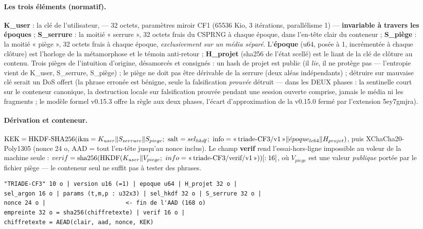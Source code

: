 \paragraph{Les trois éléments (normatif).} \textbf{K\_user} : la clé de l'utilisateur,
 — 32 octets, paramètres miroir CF1 (65536 Kio,
3 itérations, parallélisme 1) — \textbf{invariable à travers les époques} ;
\textbf{S\_serrure} : la moitié « serrure », 32 octets frais du CSPRNG à chaque époque,
dans l'en-tête clair du conteneur ; \textbf{S\_piège} : la moitié « piège », 32 octets
frais à chaque époque, \emph{exclusivement sur un média séparé}. L'\textbf{époque}
(u64, posée à 1, incrémentée à chaque clôture) est l'horloge de la métamorphose et le
témoin anti-retour ; \textbf{H\_projet} (sha256 de l'état scellé) est le liant de la clé
de clôture au contenu. Trois pièges de l'intuition d'origine, désamorcés et consignés :
un hash de projet est public (il \emph{lie}, il ne protège pas — l'entropie vient de
K\_user, S\_serrure, S\_piège) ; le piège ne doit pas être dérivable de la serrure
(deux aléas indépendants) ; détruire sur mauvaise clé serait un DoS offert (la phrase
erronée est bénigne, seule la falsification \emph{prouvée} détruit — dans les DEUX phases : la sentinelle court sur le conteneur canonique, la destruction locale sur falsification prouvée pendant une session ouverte comprise, jamais le média ni les fragments ; le modèle formel v0.15.3 offre la règle aux deux phases, l'écart d'approximation de la v0.15.0 fermé par l'extension 5ey7gmjra).

\paragraph{Dérivation et conteneur.}
$\mathrm{KEK} = \mathrm{HKDF\text{-}SHA256}(\mathrm{ikm} =
K_{user} \| S_{serrure} \| S_{piege};\ \mathrm{salt} = sel_{hkdf};\ \mathrm{info} =
\text{«\,triade-CF3/v1\,»} \| \acute{e}poque_{le64} \| H_{projet})$,
puis XChaCha20-Poly1305 (nonce 24 o, AAD = tout l'en-tête jusqu'au nonce inclus). Le
champ \textbf{verif} rend l'essai-hors-ligne impossible au voleur de la machine seule :
$verif = \mathrm{sha256}(\mathrm{HKDF}(K_{user} \| V_{piege};\ info =
\text{«\,triade-CF3/verif/v1\,»}))[:16]$, où $V_{piege}$ est une valeur
\emph{publique} portée par le fichier piège — le conteneur seul ne suffit pas à tester
des phrases.

\begin{lstlisting}
"TRIADE-CF3" 10 o | version u16 (=1) | epoque u64 | H_projet 32 o |
sel_argon 16 o | params (t,m,p : u32x3) | sel_hkdf 32 o | S_serrure 32 o |
nonce 24 o |                       <- fin de l'AAD (168 o)
empreinte 32 o = sha256(chiffretexte) | verif 16 o |
chiffretexte = AEAD(clair, aad, nonce, KEK)
\end{lstlisting}

